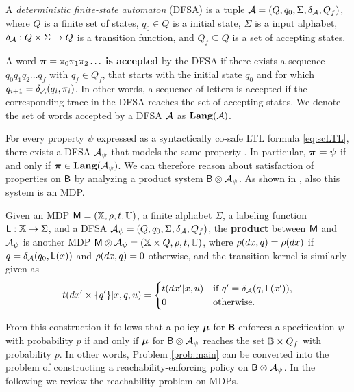 \documentclass{ifacconf}
\begin{document}
\begin{definition}
  A \emph{deterministic finite-state automaton} (DFSA) is a tuple $\mathcal{A} = (Q, q_0, \Sigma, \delta_{\mathcal{A}}, Q_f)$, where $Q$ is a finite set of states, $q_0 \in Q$ is a initial state, $\Sigma$ is a input alphabet, $\delta_{\mathcal{A}} : Q \times \Sigma \rightarrow Q$ is a transition function, and $Q_f\subseteq Q$ is a set of accepting states.

  A word ${\boldsymbol{\pi}} = \pi_0 \pi_1 \pi_2 \ldots$ \textbf{is accepted} by the DFSA if there exists a sequence $q_0 q_1 q_2 \ldots q_f$ with $q_f\in Q_f$, that starts with the initial state $q_0$ and for which $q_{i+1}=\delta_{\mathcal{A}}(q_i,\pi_i)$. In other words, a sequence of letters is accepted if the corresponding trace in the DFSA reaches the set of accepting states. We denote the set of words accepted by a DFSA $\mathcal{A}$ as $\mathbf{Lang} (\mathcal A)$.
\end{definition}

For every property $\psi$ expressed as a syntactically co-safe LTL formula \eqref{eq:scLTL}, there exists a DFSA  $\mathcal{A}_\psi$ that models the same property \citep{Belta2017}. In particular, ${\boldsymbol{\pi}}\models\psi$ if and only if ${\boldsymbol{\pi}}\in \mathbf{Lang}(\mathcal{A}_\psi)$. We can therefore reason about satisfaction of properties on $\mathsf{B}$ by analyzing a product system $\mathsf{B} \otimes \mathcal{A}_\psi$. As shown in \citep{tmka2013}, also this system is an MDP.

\begin{definition}
\label{def:product}
  Given an MDP $\mathsf{M} = ({\mathbb{X}}, \rho, t, {\mathbb{U}})$, a finite alphabet $\Sigma$, a labeling function $\mathsf{L} : {\mathbb{X}}\rightarrow\Sigma$, and a DFSA  $\mathcal{A}_\psi = (Q, q_0, \Sigma, \delta_{\mathcal{A}}, Q_f)$, the \textbf{product} between $\mathsf{M}$ and $\mathcal{A}_\psi$ is another MDP $\mathsf{M}\otimes\mathcal{A}_\psi = ({\mathbb{X}} \times Q, \relax\rho, \relax{t}, {\mathbb{U}})$, where $\relax\rho(dx,q) = \rho(dx)$ if $q= \delta_{\mathcal{A}}(q_0,\mathsf L(x))$ and $ \relax\rho(dx,q) =0$ otherwise, and the transition kernel is similarly given as
  \begin{equation*}
    \relax{t}(d x'\times\{q'\}|x,q,u) = \begin{cases}t(dx'|x,u)& \text{if } q' =\delta_{\mathcal{A}}(q,\mathsf{L}(x')),\\ 0 & \text{otherwise.}  \end{cases}
  \end{equation*}
\end{definition}

From this construction it follows that a policy ${\boldsymbol{\mu}}$ for $\mathsf{B}$ enforces a specification $\psi$ with probability $p$ if and only if ${\boldsymbol{\mu}}$ for $\mathsf{B} \otimes \mathcal{A}_\psi$ reaches the set $\mathbb{B} \times Q_f$ with probability $p$. In other words, Problem \ref{prob:main} can be converted into the problem of constructing a reachability-enforcing policy on $\mathsf{B} \otimes \mathcal{A}_\psi$. In the following we review the reachability problem on MDPs.
\end{document}
